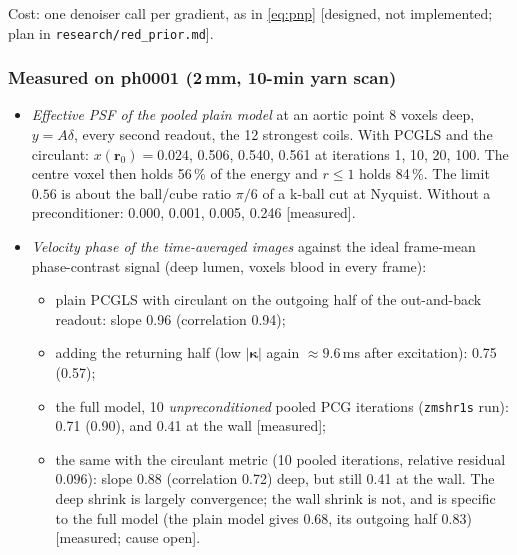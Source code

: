 \documentclass[11pt]{article}
\theoremstyle{remark}
\begin{document}
Cost: one denoiser call per gradient, as in \eqref{eq:pnp} [designed, not implemented; plan in \texttt{research/red\_prior.md}].

\subsubsection*{Measured on ph0001 (2\,mm, 10-min yarn scan)}
\begin{itemize}
  \item \emph{Effective PSF of the pooled plain model} at an aortic point 8 voxels deep, $y=A\delta$, every second readout, the 12 strongest coils. With PCGLS and the circulant: $x(\bm r_0)=0.024$, 0.506, 0.540, 0.561 at iterations 1, 10, 20, 100. The centre voxel then holds 56\,\% of the energy and $r\le1$ holds 84\,\%. The limit $0.56$ is about the ball/cube ratio $\pi/6$ of a k-ball cut at Nyquist. Without a preconditioner: 0.000, 0.001, 0.005, 0.246 [measured].
  \item \emph{Velocity phase of the time-averaged images} against the ideal frame-mean phase-contrast signal (deep lumen, voxels blood in every frame):
  \begin{itemize}
    \item plain PCGLS with circulant on the outgoing half of the out-and-back readout: slope 0.96 (correlation 0.94);
    \item adding the returning half (low $|\bm\kappa|$ again $\approx9.6$\,ms after excitation): 0.75 (0.57);
    \item the full model, 10 \emph{unpreconditioned} pooled PCG iterations (\texttt{zmshr1s} run): 0.71 (0.90), and 0.41 at the wall [measured];
    \item the same with the circulant metric (10 pooled iterations, relative residual $0.096$): slope 0.88 (correlation 0.72) deep, but still 0.41 at the wall. The deep shrink is largely convergence; the wall shrink is not, and is specific to the full model (the plain model gives 0.68, its outgoing half 0.83) [measured; cause open].
  \end{itemize}
\end{itemize}
\end{document}

